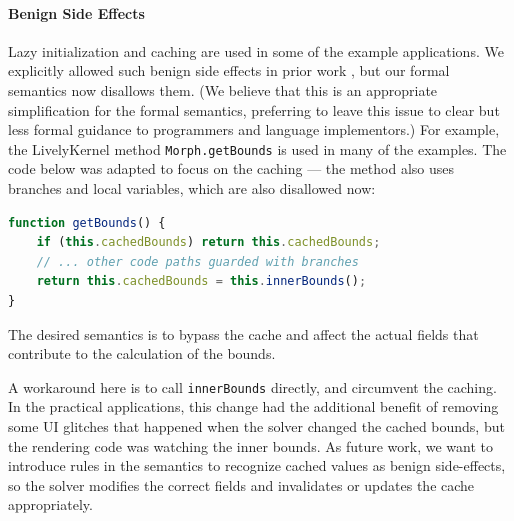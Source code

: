 \documentclass[10pt,reprint]{sigplanconf-preprint}
\begin{document}
\paragraph{Benign Side Effects }
\label{sec:benign-side-effects}
Lazy initialization and caching are used in some of the example
applications. We explicitly allowed such benign side effects in prior
work \cite{FelgentreffJOT14,FelgentreffECOOP14}, but our formal
semantics now disallows them.  (We believe that this is an appropriate
simplification for the formal semantics, preferring to leave this issue
to clear but less formal guidance to programmers and language
implementors.)  For example, the LivelyKernel method
\verb|Morph.getBounds| is used in many of the
examples.  The code below was adapted to focus on the caching --- the
method also uses branches and local variables, which are also
disallowed now:
\begin{lstlisting}[language=JavaScript,caption={~},label=lst:getBounds]
function getBounds() {
    if (this.cachedBounds) return this.cachedBounds;
    // ... other code paths guarded with branches
    return this.cachedBounds = this.innerBounds();
}
\end{lstlisting}
The desired semantics is to bypass the cache and affect the actual
fields that contribute to the calculation of the bounds.

A workaround here is to call \verb|innerBounds| directly, and
circumvent the caching. In the practical applications, this change had
the additional benefit of removing some UI glitches that happened when
the solver changed the cached bounds, but the rendering code was
watching the inner bounds.
As future work, we want to introduce rules in the semantics to
recognize cached values as benign side-effects, so the solver modifies
the correct fields and invalidates or updates the cache appropriately.

\end{document}
